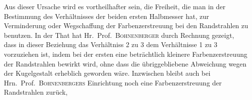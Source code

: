 Aus dieser Ursache wird es vortheilhafter sein, die Freiheit, die man in der Bestimmung des Verhältnisses der beiden ersten Halbmesser hat, zur Verminderung oder Wegschaffung der Farbenzerstreuung bei den Randstrahlen zu benutzen. In der That hat Hr.\ Prof.\ \textsc{Bohnenberger} durch Rechnung gezeigt, dass in dieser Beziehung das Verhältniss 2 zu 3 dem Verhältnisse 1 zu 3 vorzuziehen ist, indem bei der ersten eine beträchtlich kleinere Farbenzerstreuung der Randstrahlen bewirkt wird, ohne dass die übriggebliebene Abweichung wegen der Kugelgestalt erheblich geworden wäre. Inzwischen bleibt auch bei Hrn.\ Prof.\ \textsc{Bohnenbergers} Einrichtung noch eine Farbenzerstreuung der Randstrahlen zurück,
